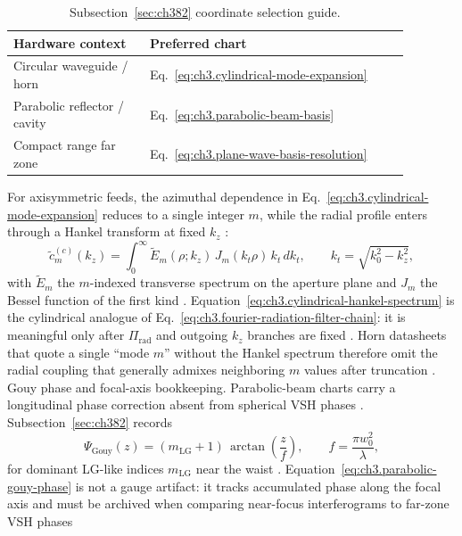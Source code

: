 \begin{table}[t]
\centering
\caption{Subsection~\ref{sec:ch382} coordinate selection guide.}
\label{tab:ch3.382-selection-guide}
\small
\begin{tabular}{@{}p{0.30\linewidth}p{0.58\linewidth}@{}}
\toprule
Hardware context & Preferred chart \\
\midrule
Circular waveguide / horn & Eq.~\eqref{eq:ch3.cylindrical-mode-expansion} \\
Parabolic reflector / cavity & Eq.~\eqref{eq:ch3.parabolic-beam-basis} \\
Compact range far zone & Eq.~\eqref{eq:ch3.plane-wave-basis-resolution} \\
\bottomrule
\end{tabular}
\end{table}
For axisymmetric feeds, the azimuthal dependence in Eq.~\eqref{eq:ch3.cylindrical-mode-expansion} reduces to a single integer \(m\), while the
radial profile enters through a Hankel transform at fixed \(k_{z}\) \cite{jackson1999}:
\begin{equation}
\label{eq:ch3.cylindrical-hankel-spectrum}
\widetilde{c}_{m}^{(c)}(k_{z})
=
\int_{0}^{\infty}
\widetilde{E}_{m}(\rho;k_{z})\,J_{m}(k_{t}\rho)\,k_{t}\,dk_{t},
\qquad
k_{t}=\sqrt{k_{0}^{2}-k_{z}^{2}},
\end{equation}
with \(\widetilde{E}_{m}\) the \(m\)-indexed transverse spectrum on the aperture plane and \(J_{m}\) the Bessel function of the first kind
\cite{stratton1941}. Equation~\eqref{eq:ch3.cylindrical-hankel-spectrum} is the cylindrical analogue of
Eq.~\eqref{eq:ch3.fourier-radiation-filter-chain}: it is meaningful only after \(\Pi_{\mathrm{rad}}\) and outgoing \(k_{z}\) branches are fixed
\cite{harrington2001}. Horn datasheets that quote a single ``mode \(m\)'' without the Hankel spectrum therefore omit the radial
coupling that generally admixes neighboring \(m\) values after truncation \cite{hansen1988}.
Gouy phase and focal-axis bookkeeping. Parabolic-beam charts carry a longitudinal phase correction absent from spherical VSH phases \cite{allen1992}.
Subsection~\ref{sec:ch382} records
\begin{equation}
\label{eq:ch3.parabolic-gouy-phase}
\Psi_{\mathrm{Gouy}}(z)
=
(m_{\mathrm{LG}}+1)\,
\arctan\!\left(\frac{z}{f}\right),
\qquad
f=\frac{\pi w_{0}^{2}}{\lambda},
\end{equation}
for dominant LG-like indices \(m_{\mathrm{LG}}\) near the waist \cite{allen1992}. Equation~\eqref{eq:ch3.parabolic-gouy-phase} is not a
gauge artifact: it tracks accumulated phase along the focal axis and must be archived when comparing near-focus interferograms to far-zone VSH phases

